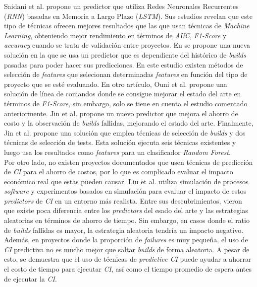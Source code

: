 Saidani et al. \cite{15} propone un predictor que utiliza Redes Neuronales Recurrentes
(\textit{RNN}) basadas en Memoria a Largo Plazo (\textit{LSTM}). Sus estudios revelan que este
tipo de técnicas ofrecen mejores resultados que las que usan técnicas de \textit{Machine
Learning}, obteniendo mejor rendimiento en términos de \textit{AUC}, \textit{F1-Score} y
\textit{accuracy} cuando se trata de validación entre proyectos. En \cite{6} se propone una
nueva solución en la que se usa un predictor que es dependiente del histórico de \textit{builds}
pasadas para poder hacer sus predicciones. En este estudio existen métodos de selección de
\textit{features} que selecionan determinadas \textit{features} en función del tipo de proyecto
que se esté evaluando. En otro artículo, Ouni et al. \cite{14} propone una solución de línea de
comandos donde se consigue mejorar el estado del arte en términos de \textit{F1-Score}, sin
embargo, solo se tiene en cuenta el estudio \cite{7} comentado anteriormente. Jin et al.
\cite{4} propone un nuevo predictor que mejora el ahorro de costo y la observación de
\textit{builds} fallidas, mejorando el estado del arte. Finalmente, Jin et al. \cite{1} propone
una solución que emplea técnicas de selección de \textit{builds} y dos técnicas de selección
de tests. Esta solución ejecuta seis técnicas existentes y luego usa los resultados como
\textit{features} para un clasificador \textit{Random Forest}.\\

Por otro lado, no existen proyectos documentados que usen técnicas de predicción de \textit{CI}
para el ahorro de costos, por lo que es complicado evaluar el impacto económico real que estas
pueden causar. Liu et al. \cite{19} utiliza simulación de procesos \textit{software} y
experimentos basados en simulación para evaluar el impacto de estos \textit{predictors} de
\textit{CI} en un entorno más realista. Entre sus descubrimientos, vieron que existe poca
diferencia entre los \textit{predictors} del esado del arte y las estrategias aleatorias en
términos de ahorro de tiempo. Sin embargo, en casos donde el ratio de \textit{builds} fallidas
es mayor, la estrategia aleatoria tendría un impacto negativo. Además, en proyectos donde la
proporción de \textit{failures} es muy pequeña, el uso de \textit{CI} predictiva no es mucho
mejor que saltar \textit{builds} de forma aleatoria. A pesar de esto, se demuestra que el uso
de técnicas de \textit{predictive CI} puede ayudar a ahorrar el costo de tiempo para ejecutar
\textit{CI}, así como el tiempo promedio de espera antes de ejecutar la \textit{CI}.\\
